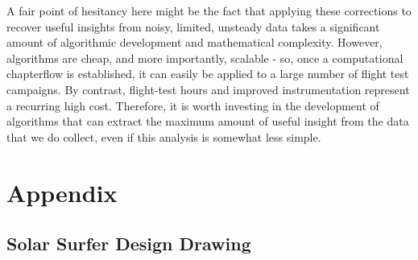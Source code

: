A fair point of hesitancy here might be the fact that applying these corrections to recover useful insights from noisy, limited, unsteady data takes a significant amount of algorithmic development and mathematical complexity. However, algorithms are cheap, and more importantly, scalable - so, once a computational chapterflow is established, it can easily be applied to a large number of flight test campaigns. By contrast, flight-test hours and improved instrumentation represent a recurring high cost. Therefore, it is worth investing in the development of algorithms that can extract the maximum amount of useful insight from the data that we do collect, even if this analysis is somewhat less simple.



\clearpage


\section{Appendix}

\subsection{Solar Surfer Design Drawing}
\label{sec:solar_surfer_drawing}

\begin{figure}[H]
    \centering
    \label{fig:solar_surfer_design}
\end{figure}

